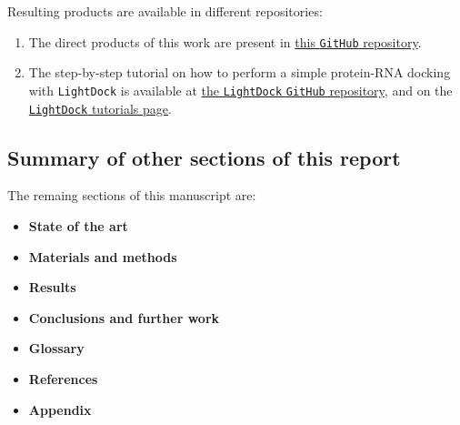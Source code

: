 Resulting products are available in different repositories:
\begin{enumerate}
    \item The direct products of this work are present in \href{https://github.com/luksgrin/UOC_TFM}{this \texttt{GitHub} repository}.
    \item The step-by-step tutorial on how to perform a simple protein-RNA docking with \texttt{LightDock} is available at \href{https://github.com/lightdock/lightdock.github.io}{the \texttt{LightDock} \texttt{GitHub} repository}, and on the \href{https://lightdock.org/tutorials/}{\texttt{LightDock} tutorials page}.
\end{enumerate}

\subsection{Summary of other sections of this report}


The remaing sections of this manuscript are:

\begin{itemize}
    \item\textbf{State of the art}
    \item\textbf{Materials and methods}
    \item\textbf{Results}
    \item\textbf{Conclusions and further work}
    \item\textbf{Glossary}
    \item\textbf{References}
    \item\textbf{Appendix}
\end{itemize}



